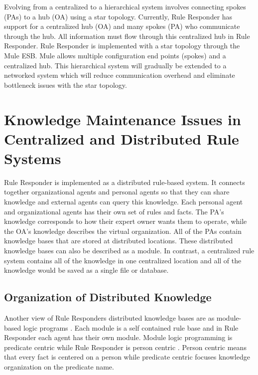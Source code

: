 \documentclass[12pt]{report}
\begin{document}
Evolving from a centralized to a hierarchical system involves connecting spokes (PAs) to a hub (OA) using a star topology.  Currently, Rule Responder has support for a centralized hub (OA) and many spokes (PA) who communicate through the hub.  All information must flow through this centralized hub in Rule Responder.  Rule Responder is implemented with a star topology through the Mule ESB.  Mule allows multiple configuration end points (spokes) and a centralized hub.  This hierarchical system will gradually be extended to a networked system which will reduce communication overhead and eliminate bottleneck issues with the star topology.

\chapter{Knowledge Maintenance Issues in Centralized and Distributed Rule Systems}
Rule Responder is implemented as a distributed rule-based system.  It connects together organizational agents and personal agents so that they can share knowledge and external agents can query this knowledge.  Each personal agent and organizational agents has their own set of rules and facts.  The PA's knowledge corresponds to how their expert owner wants them to operate, while the OA's knowledge describes the virtual organization.  All of the PAs contain knowledge bases that are stored at distributed locations.  These distributed knowledge bases can also be described as a module.  In contrast, a centralized rule system contains all of the knowledge in one centralized location and all of the knowledge would be saved as a single file or database.

\section{Organization of Distributed Knowledge}

Another view of Rule Responders distributed knowledge bases are as module-based logic programs \cite{Modularity}.  Each module is a self contained rule base and in Rule Responder each agent has their own module.  Module logic programming is predicate centric while Rule Responder is person centric \cite{Modularity}.  Person centric means that every fact is centered on a person while predicate centric focuses knowledge organization on the predicate name.
\end{document}
